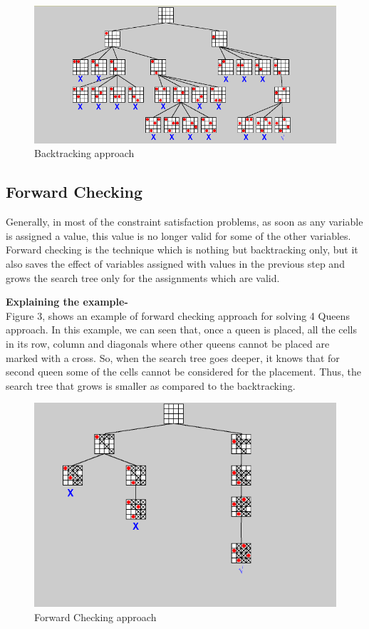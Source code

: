 \documentclass[conference]{IEEEtran}
\begin{document}
\begin{figure}
\includegraphics[scale=0.5]{Backtracking.png}
\caption{Backtracking approach}
\label{Figure3}
\end{figure}


\subsection{Forward Checking}

Generally, in most of the constraint satisfaction problems, as soon as any variable is assigned a value, this value is no longer valid for some of the other variables. Forward checking is the technique which is nothing but backtracking only, but it also saves the effect of variables assigned with values in the previous step and grows the search tree only for the assignments which are valid.

 \textbf{Explaining the example- }
\\ Figure 3, shows an example of forward checking approach for solving 4 Queens approach. In this example, we can seen that, once a queen is placed, all the cells in its row, column and diagonals where other queens cannot be placed are marked with a cross. So, when the search tree goes deeper, it knows that for second queen some of the cells cannot be considered for the placement. Thus, the search tree that grows is smaller as compared to the backtracking. 

\begin{figure}
\includegraphics[scale=0.65]{ForwardChecking.png}
\caption{Forward Checking approach}
\label{Figure4}
\end{figure}
\end{document}
